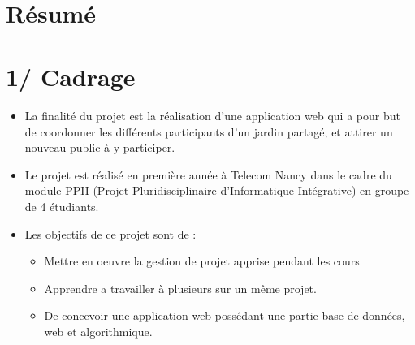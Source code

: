 \documentclass{report}
\begin{document}
\newpage



\begin{center}
    \textbf{\color{orange}{\Huge Charte-projet}} \\
    \textbf{\color{blue}{\Large Table des matières}}
\end{center}

\section*{Résumé}
\section*{1/ Cadrage}
\begin{itemize}
    \item La finalité du projet est la réalisation d'une application web qui a pour but de coordonner les différents participants d'un jardin partagé, et attirer un nouveau public à y participer.
    \item Le projet est réalisé en première année à Telecom Nancy dans le cadre du module PPII (Projet Pluridisciplinaire d'Informatique Intégrative) en groupe de 4 étudiants.
    \item Les objectifs de ce projet sont de :  
    \begin{itemize}
        \item Mettre en oeuvre la gestion de projet apprise pendant les cours
        \item Apprendre a travailler à plusieurs sur un même projet.
        \item De concevoir une application web possédant une partie base de données, web et algorithmique.
    \end{itemize}
\end{itemize}
\end{document}
